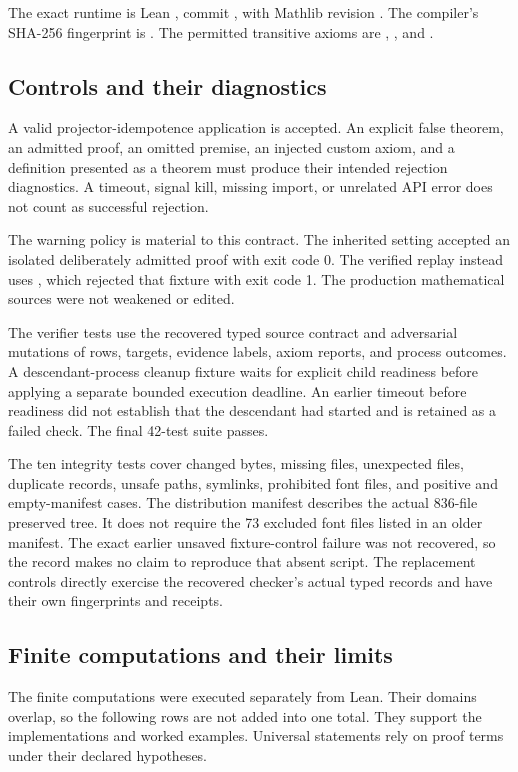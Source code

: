 The exact runtime is Lean , commit , with Mathlib revision . The compiler's SHA-256 fingerprint is . The permitted transitive axioms are , , and .

\subsection{Controls and their diagnostics}
A valid projector-idempotence application is accepted. An explicit false theorem, an admitted proof, an omitted premise, an injected custom axiom, and a definition presented as a theorem must produce their intended rejection diagnostics. A timeout, signal kill, missing import, or unrelated API error does not count as successful rejection.

The warning policy is material to this contract. The inherited  setting accepted an isolated deliberately admitted proof with exit code 0. The verified replay instead uses , which rejected that fixture with exit code 1. The production mathematical sources were not weakened or edited.

The verifier tests use the recovered typed source contract and adversarial mutations of rows, targets, evidence labels, axiom reports, and process outcomes. A descendant-process cleanup fixture waits for explicit child readiness before applying a separate bounded execution deadline. An earlier timeout before readiness did not establish that the descendant had started and is retained as a failed check. The final 42-test suite passes.

The ten integrity tests cover changed bytes, missing files, unexpected files, duplicate records, unsafe paths, symlinks, prohibited font files, and positive and empty-manifest cases. The distribution manifest describes the actual 836-file preserved tree. It does not require the 73 excluded font files listed in an older manifest. The exact earlier unsaved fixture-control failure was not recovered, so the record makes no claim to reproduce that absent script. The replacement controls directly exercise the recovered checker's actual typed records and have their own fingerprints and receipts.

\subsection{Finite computations and their limits}
The finite computations were executed separately from Lean. Their domains overlap, so the following rows are not added into one total. They support the implementations and worked examples. Universal statements rely on proof terms under their declared hypotheses.

